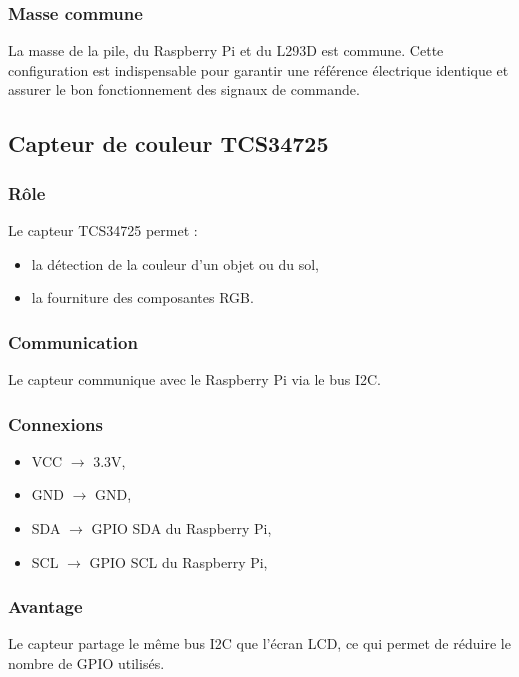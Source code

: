 \subsubsection{Masse commune}
La masse de la pile, du Raspberry Pi et du L293D est commune. Cette configuration est indispensable pour garantir une référence électrique identique et assurer le bon fonctionnement des signaux de commande.


\subsection{Capteur de couleur TCS34725}

\subsubsection{Rôle}
Le capteur TCS34725 permet :
\begin{itemize}
    \item la détection de la couleur d’un objet ou du sol,
    \item la fourniture des composantes RGB.
\end{itemize}

\subsubsection{Communication}
Le capteur communique avec le Raspberry Pi via le bus I2C.

\subsubsection{Connexions}
\begin{itemize}
    \item VCC $\rightarrow$ 3.3V,
    \item GND $\rightarrow$ GND,
    \item SDA $\rightarrow$ GPIO SDA du Raspberry Pi,
    \item SCL $\rightarrow$ GPIO SCL du Raspberry Pi,
\end{itemize}

\subsubsection{Avantage}
Le capteur partage le même bus I2C que l’écran LCD, ce qui permet de réduire le nombre de GPIO utilisés.

